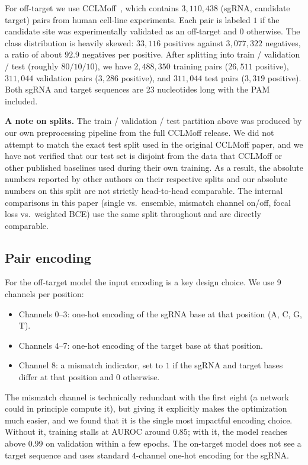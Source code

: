 \documentclass[11pt,a4paper]{article}
\begin{document}
For off-target we use CCLMoff~\citep{cclmoff}, which contains $3{,}110{,}438$ (sgRNA, candidate target) pairs from human cell-line experiments. Each pair is labeled $1$ if the candidate site was experimentally validated as an off-target and $0$ otherwise. The class distribution is heavily skewed: $33{,}116$ positives against $3{,}077{,}322$ negatives, a ratio of about $92.9$ negatives per positive. After splitting into train / validation / test (roughly $80/10/10$), we have $2{,}488{,}350$ training pairs ($26{,}511$ positive), $311{,}044$ validation pairs ($3{,}286$ positive), and $311{,}044$ test pairs ($3{,}319$ positive). Both sgRNA and target sequences are 23 nucleotides long with the PAM included.

\textbf{A note on splits.} The train / validation / test partition above was produced by our own preprocessing pipeline from the full CCLMoff release. We did not attempt to match the exact test split used in the original CCLMoff paper, and we have not verified that our test set is disjoint from the data that CCLMoff or other published baselines used during their own training. As a result, the absolute numbers reported by other authors on their respective splits and our absolute numbers on this split are not strictly head-to-head comparable. The internal comparisons in this paper (single vs.\ ensemble, mismatch channel on/off, focal loss vs.\ weighted BCE) use the same split throughout and are directly comparable.

\subsection{Pair encoding}
\label{subsec:pair_encoding}

For the off-target model the input encoding is a key design choice. We use 9 channels per position:
\begin{itemize}[leftmargin=*,topsep=2pt,itemsep=1pt]
\item Channels $0$--$3$: one-hot encoding of the sgRNA base at that position (A, C, G, T).
\item Channels $4$--$7$: one-hot encoding of the target base at that position.
\item Channel $8$: a mismatch indicator, set to $1$ if the sgRNA and target bases differ at that position and $0$ otherwise.
\end{itemize}

The mismatch channel is technically redundant with the first eight (a network could in principle compute it), but giving it explicitly makes the optimization much easier, and we found that it is the single most impactful encoding choice. Without it, training stalls at AUROC around $0.85$; with it, the model reaches above $0.99$ on validation within a few epochs. The on-target model does not see a target sequence and uses standard $4$-channel one-hot encoding for the sgRNA.
\end{document}
